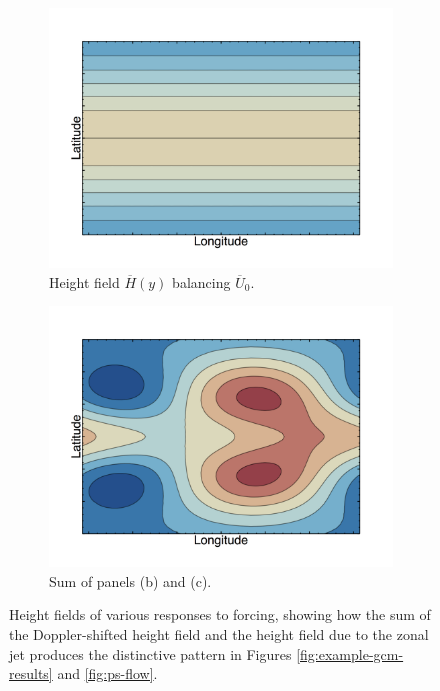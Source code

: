 \begin{figure}
\\
  \begin{subfigure}[t]{0.48\textwidth}
    \includegraphics[width=\textwidth]{figures/wave-mean-flow/expl-phibar.png}
    \caption{Height field $\overline{H}(y)$ balancing $\overline{U}_{0}$.}
    \label{fig:expl-phibar}
  \end{subfigure}
  \begin{subfigure}[t]{0.48\textwidth}
    \includegraphics[width=\textwidth]{figures/wave-mean-flow/expl-plot-total.png}
    \caption{Sum of panels (b) and (c).}
    \label{fig:expl-plot-total}
  \end{subfigure}
  \caption{Height fields of various responses to forcing, showing how the sum of the Doppler-shifted height field and the height field due to the zonal jet produces the distinctive pattern in Figures \ref{fig:example-gcm-results} and \ref{fig:ps-flow}.}
  \label{fig:first-order-solutions}
\end{figure}

